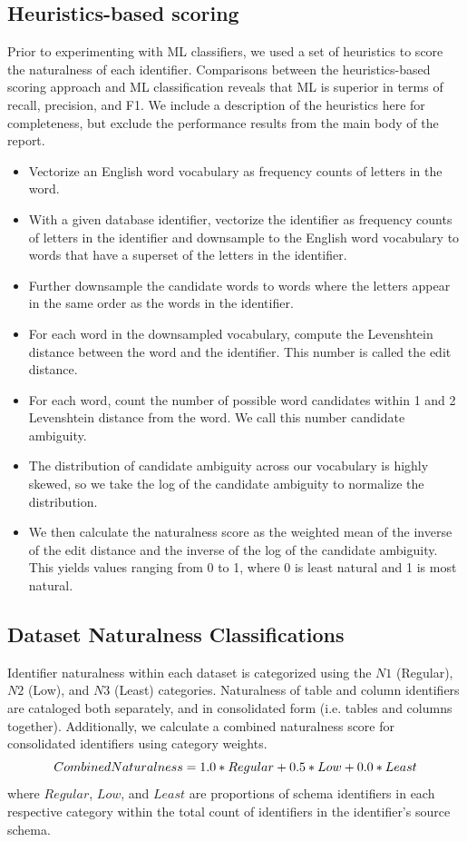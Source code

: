 \subsection{Heuristics-based scoring} 

Prior to experimenting with ML classifiers, we used a set of heuristics to score the naturalness of each identifier. 
Comparisons between the heuristics-based scoring approach and ML classification reveals that ML is superior in terms of recall, precision, and F1.
We include a description of the heuristics here for completeness, but exclude the performance results from the main body of the report.

\begin{itemize}
  \item Vectorize an English word vocabulary as frequency counts of letters in the word.
  \item With a given database identifier, vectorize the identifier as frequency counts of letters in the identifier and downsample to the English word vocabulary to words that have a superset of the letters in the identifier.
  \item Further downsample the candidate words to words where the letters appear in the same order as the words in the identifier.
  \item For each word in the downsampled vocabulary, compute the Levenshtein distance between the word and the identifier. This number is called the edit distance.
  \item For each word, count the number of possible word candidates within 1 and 2 Levenshtein distance from the word. We call this number candidate ambiguity.
  \item The distribution of candidate ambiguity across our vocabulary is highly skewed, so we take the log of the candidate ambiguity to normalize the distribution.
  \item We then calculate the naturalness score as the weighted mean of the inverse of the edit distance and the inverse of the log of the candidate ambiguity. This yields values ranging from 0 to 1, where 0 is least natural and 1 is most natural.
\end{itemize}


\subsection{Dataset Naturalness Classifications}
\label{section:natclassification}

Identifier naturalness within each dataset is categorized using the $N1$ (Regular), $N2$ (Low), and $N3$ (Least) categories.
Naturalness of table and column identifiers are cataloged both separately, and in consolidated form (i.e. tables and columns together).
Additionally, we calculate a combined naturalness score for consolidated identifiers using category weights.
\begin{equation}
  $$CombinedNaturalness = 1.0*Regular + 0.5*Low + 0.0*Least$$ 
  \label{equation:combined-naturalness}
\end{equation}
where $Regular$, $Low$, and $Least$ are proportions of schema identifiers in each respective category within the total count of identifiers in the identifier's source schema.

